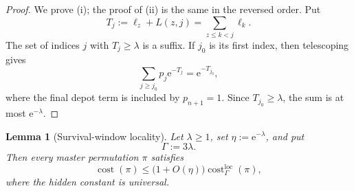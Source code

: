 \documentclass[11pt]{article}
\newtheorem{lemma}{Lemma}
\newcommand{\cost}{\operatorname{cost}}
\newcommand{\loc}{\operatorname{loc}}
\newcommand{\e}{\mathrm e}
\begin{document}
\begin{proof}
We prove (i); the proof of (ii) is the same in the reversed order.  Put
\[
    T_j:=\ell_z+L(z,j)=\sum_{z\le k<j}\ell_k.
\]
The set of indices $j$ with $T_j\ge\lambda$ is a suffix.  If $j_0$ is its first
index, then telescoping gives
\[
    \sum_{j\ge j_0} p_j\e^{-T_j}=\e^{-T_{j_0}},
\]
where the final depot term is included by $p_{n+1}=1$.  Since
$T_{j_0}\ge\lambda$, the sum is at most $\e^{-\lambda}$.
\end{proof}

\begin{lemma}[Survival-window locality]\label{lem:survival-window-locality}
Let $\lambda\ge1$, set $\eta:=\e^{-\lambda}$, and put
\[
    \Gamma:=3\lambda.
\]
Then every master permutation $\pi$ satisfies
\[
    \cost(\pi)
    \le
    \bigl(1+O(\eta)\bigr)\cost^{\loc}_{\Gamma}(\pi),
\]
where the hidden constant is universal.
\end{lemma}
\end{document}
